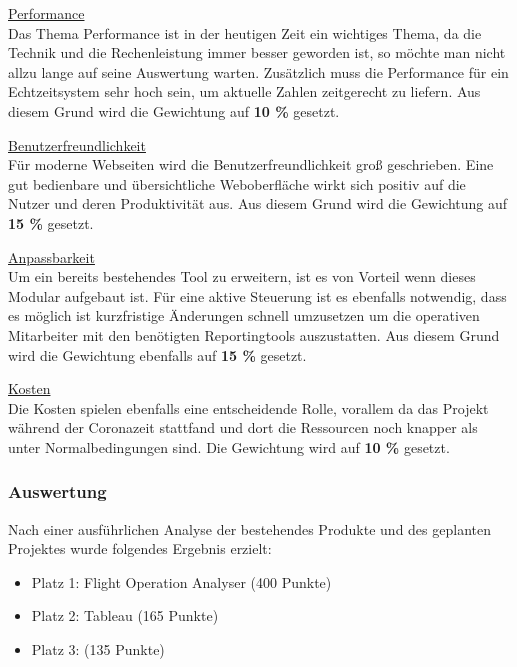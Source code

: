 		\vspace{8pt}

		{
			\noindent
			\underline{Performance}\\
			Das Thema Performance ist in der heutigen Zeit ein wichtiges Thema, da die Technik und die Rechenleistung immer besser geworden ist, so möchte man nicht allzu lange auf seine Auswertung warten. Zusätzlich muss die Performance für ein Echtzeitsystem sehr hoch sein, um aktuelle Zahlen zeitgerecht zu liefern. Aus diesem Grund wird die Gewichtung auf \textbf{10 \%} gesetzt.
		}

		\vspace{8pt}

		{
			\noindent
			\underline{Benutzerfreundlichkeit}\\
			Für moderne Webseiten wird die Benutzerfreundlichkeit groß geschrieben. Eine gut bedienbare und übersichtliche Weboberfläche wirkt sich positiv auf die Nutzer und deren Produktivität aus. Aus diesem Grund wird die Gewichtung auf \textbf{15 \%} gesetzt.
		}

		\vspace{8pt}

		{
			\noindent
			\underline{Anpassbarkeit}\\
			Um ein bereits bestehendes Tool zu erweitern, ist es von Vorteil wenn dieses Modular aufgebaut ist. Für eine aktive Steuerung ist es ebenfalls notwendig, dass es möglich ist kurzfristige Änderungen schnell umzusetzen um die operativen Mitarbeiter mit den benötigten Reportingtools auszustatten. Aus diesem Grund wird die Gewichtung ebenfalls auf \textbf{15 \%} gesetzt.
		}

		\vspace{8pt}

		{
			\noindent
			\underline{Kosten}\\
			Die Kosten spielen ebenfalls eine entscheidende Rolle, vorallem da das Projekt während der Coronazeit stattfand und dort die Ressourcen noch knapper als unter Normalbedingungen sind. Die Gewichtung wird auf \textbf{10 \%} gesetzt.
		}

		\subsubsection{Auswertung}
		Nach einer ausführlichen Analyse der bestehendes Produkte und des geplanten Projektes wurde folgendes Ergebnis erzielt:

		\begin{itemize}
			\item Platz 1: Flight Operation Analyser (400 Punkte)
			\item Platz 2: Tableau (165 Punkte)
			\item Platz 3:  (135 Punkte)
		\end{itemize}


